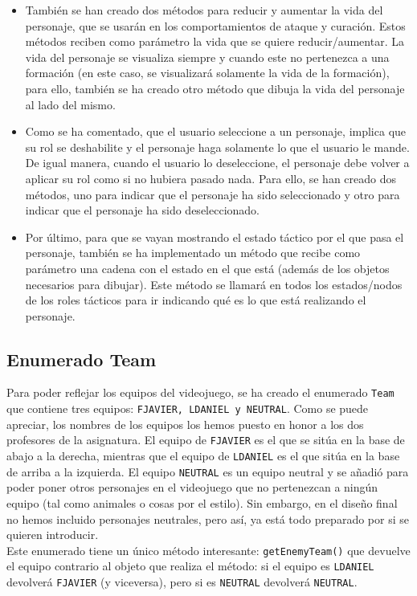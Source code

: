 \begin{itemize}
 \item También se han creado dos métodos para reducir y aumentar la vida del personaje, que se usarán en los comportamientos de ataque y curación. Estos métodos reciben como parámetro la vida que se quiere reducir/aumentar. La vida del personaje se visualiza siempre y cuando este no pertenezca a una formación (en este caso, se visualizará solamente la vida de la formación), para ello, también se ha creado otro método que dibuja la vida del personaje al lado del mismo.
 \item Como se ha comentado, que el usuario seleccione a un personaje, implica que su rol se deshabilite y el personaje haga solamente lo que el usuario le mande. De igual manera, cuando el usuario lo deseleccione, el personaje debe volver a aplicar su rol como si no hubiera pasado nada. Para ello, se han creado dos métodos, uno para indicar que el personaje ha sido seleccionado y otro para indicar que el personaje ha sido deseleccionado.
 \item Por último, para que se vayan mostrando el estado táctico por el que pasa el personaje, también se ha implementado un método que recibe como parámetro una cadena con el estado en el que está (además de los objetos necesarios para dibujar). Este método se llamará en todos los estados/nodos de los roles tácticos para ir indicando qué es lo que está realizando el personaje.
\end{itemize}



\medskip
\subsection{Enumerado Team}
Para poder reflejar los equipos del videojuego, se ha creado el enumerado \texttt{Team} que contiene tres equipos: \texttt{FJAVIER, LDANIEL y NEUTRAL}. Como se puede apreciar, los nombres de los equipos los hemos puesto en honor a los dos profesores de la asignatura. El equipo de \texttt{FJAVIER} es el que se sitúa en la base de abajo a la derecha, mientras que el equipo de \texttt{LDANIEL} es el que sitúa en la base de arriba a la izquierda. El equipo \texttt{NEUTRAL} es un equipo neutral y se añadió para poder poner otros personajes en el videojuego que no pertenezcan a ningún equipo (tal como animales o cosas por el estilo). Sin embargo, en el diseño final no hemos incluido personajes neutrales, pero así, ya está todo preparado por si se quieren introducir. \\

Este enumerado tiene un único método interesante: \texttt{getEnemyTeam()} que devuelve el equipo contrario al objeto que realiza el método: si el equipo es \texttt{LDANIEL} devolverá \texttt{FJAVIER} (y viceversa), pero si es \texttt{NEUTRAL} devolverá \texttt{NEUTRAL}.













